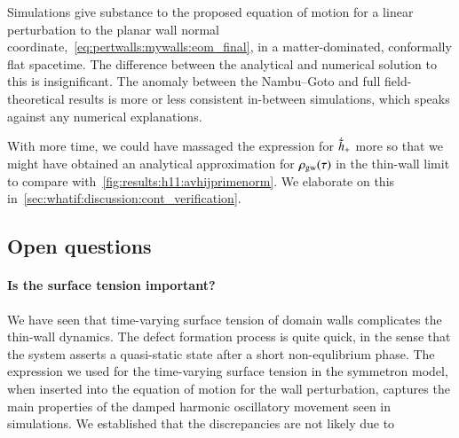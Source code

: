 




\newcommand\Ft{\ALIASFt}
\newcommand\ah{\ALIASah}
\newcommand\lcoord{\ALIASlcoord}
\newcommand\lcoordx{\ALIASlcoordx}
\newcommand\lcoordk{\ALIASlcoordk}
\newcommand\hpA{\ALIAShpA}
\newcommand\hpB{\ALIAShpB}
\newcommand\hpC{\ALIAShpC}
\newcommand\hpAB{\ALIAShpAB}
\newcommand\hpCR{\ALIAShpCR}
\newcommand\hpCI{\ALIAShpCI}
\newcommand\epsA{\ALIASepsA}
\newcommand\epsB{\ALIASepsB}
\newcommand\epsC{\ALIASepsC}






Simulations give substance to the proposed equation of motion for a linear perturbation to the planar wall normal coordinate,~\cref{eq:pertwalls:mywalls:eom_final}, in a matter-dominated, conformally flat spacetime. The difference between the analytical and numerical solution to this is insignificant. The anomaly between the Nambu--Goto and full field-theoretical results is more or less consistent in-between simulations, which speaks against any numerical explanations.





With more time, we could have massaged the expression for $\dot{\Ft{h}}_+$ more so that we might have obtained an analytical approximation for $\rho_\mathrm{gw}(\tau)$ in the thin-wall limit to compare with~\cref{fig:results:h11:avhijprimenorm}. We elaborate on this in~\cref{sec:whatif:discussion:cont_verification}.





\subsection{Open questions}

\paragraph{Is the surface tension important?} %
We have seen that time-varying surface tension of domain walls complicates the thin-wall dynamics. The defect formation process is quite quick, in the sense that the system asserts a quasi-static state after a short non-equlibrium phase. The expression we used for the time-varying surface tension in the symmetron model, when inserted into the equation of motion for the wall perturbation, captures the main properties of the damped harmonic oscillatory movement seen in simulations. We established that the discrepancies are not likely due to \blahblah {}


